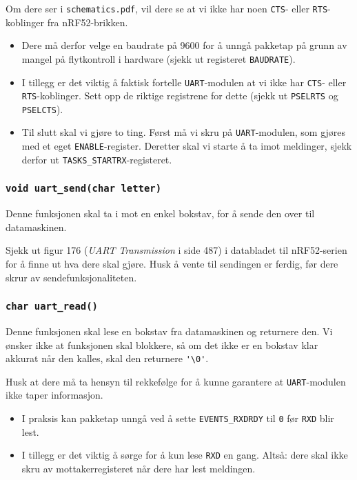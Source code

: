 Om dere ser i \verb|schematics.pdf|, vil dere se at vi ikke har noen \verb|CTS|- eller \verb|RTS|-koblinger fra nRF52-brikken. 

\begin{itemize}
    \item Dere må derfor velge en baudrate på 9600 for å unngå pakketap på grunn av mangel på flytkontroll i hardware (sjekk ut registeret \verb|BAUDRATE|).
    \item I tillegg er det viktig å faktisk fortelle \verb|UART|-modulen at vi ikke har \verb|CTS|- eller \verb|RTS|-koblinger. Sett opp de riktige registrene for dette (sjekk ut \verb|PSELRTS| og \verb|PSELCTS|).
    \item 

Til slutt skal vi gjøre to ting. Først må vi skru på \verb|UART|-modulen, som gjøres med et eget \verb|ENABLE|-register. Deretter skal vi starte å ta imot meldinger, sjekk derfor ut \verb|TASKS_STARTRX|-registeret. 
\end{itemize}







\cprotect\subsubsection{\lstinline{void uart_send(char letter)}}

Denne funksjonen skal ta i mot en enkel bokstav, for å sende den over til datamaskinen.

Sjekk ut figur 176 (\textit{UART Transmission} i side 487) i databladet til nRF52-serien for å finne ut hva dere skal gjøre. Husk å vente til sendingen er ferdig, før dere skrur av sendefunksjonaliteten.


\cprotect\subsubsection{\lstinline{char uart_read()}}

Denne funksjonen skal lese en bokstav fra datamaskinen og returnere den. Vi ønsker ikke at funksjonen skal blokkere, så om det ikke er en bokstav klar akkurat når den kalles, skal den returnere \verb|'\0'|.

Husk at dere må ta hensyn til rekkefølge for å kunne garantere at \verb|UART|-modulen ikke taper informasjon.

\begin{itemize}
    \item I praksis kan pakketap unngå ved å sette \verb|EVENTS_RXDRDY| til \verb|0| før \verb|RXD| blir lest.
    \item I tillegg er det viktig å sørge for å kun lese \verb|RXD| en gang. Altså: dere skal ikke skru av mottakerregisteret når dere har lest meldingen.
\end{itemize}
